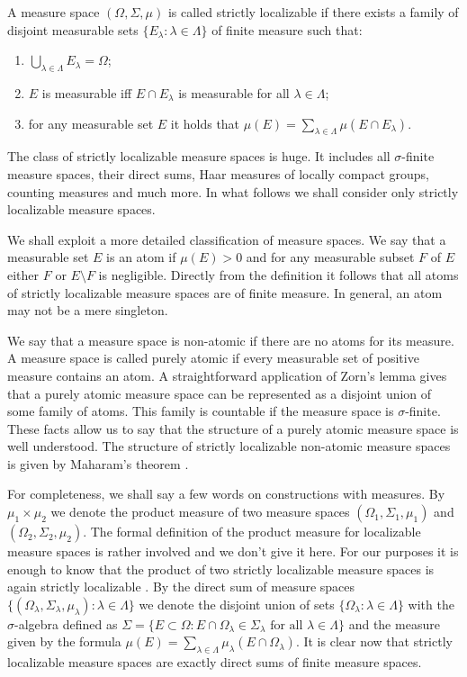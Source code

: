 A measure space $(\Omega,\Sigma,\mu)$ is called strictly localizable if there
exists a family of disjoint measurable sets 
$ \{E_\lambda:\lambda\in\Lambda \}$ of finite measure such that: 
\begin{enumerate}[label = (\roman*)]
  \item $\bigcup_{\lambda\in\Lambda}E_\lambda=\Omega$;

  \item $E$ is measurable iff $E\cap E_\lambda$ is measurable for all
  $\lambda\in\Lambda$;

  \item for any measurable set $E$ it holds that 
  $\mu(E)=\sum_{\lambda\in\Lambda}\mu(E\cap E_\lambda)$. 
\end{enumerate}
  
The class of strictly localizable measure spaces is huge. It includes all
$\sigma$-finite measure spaces, their direct sums, Haar measures of
locally compact groups, counting measures and much more. In what follows we
shall consider only strictly localizable measure spaces.

We shall exploit a more detailed classification of measure spaces. We say that a
measurable set $E$ is an atom if $\mu(E)>0$ and for any measurable subset $F$ of
$E$ either $F$ or $E\setminus F$ is negligible. Directly from the definition it
follows that all atoms of strictly localizable measure spaces are of finite
measure. In general, an atom may not be a mere singleton.

We say that a measure space is non-atomic if there are no atoms for its measure.
A measure space is called purely atomic if every measurable set of positive
measure contains an atom. A straightforward application of Zorn's lemma gives
that a purely atomic measure space can be represented as a disjoint union of some
family of atoms. This family is countable if the measure space is $\sigma$-finite.
These facts allow us to say that the structure of a purely atomic measure space is
well understood. The structure of strictly localizable non-atomic measure spaces
is given by Maharam's theorem \cite[332B]{FremMeasTh}. 

For completeness, we shall say a few words on constructions with measures. 
By $\mu_1\times \mu_2$ we denote the product measure of two measure spaces 
$(\Omega_1,\Sigma_1,\mu_1)$ and $(\Omega_2,\Sigma_2,\mu_2)$. The formal definition of
the product measure for localizable measure spaces is rather involved
\cite[definition 251F]{FremMeasTh} and we don't give it here.  For our
purposes it is enough to know that the product of two strictly localizable
measure spaces is again strictly localizable \cite[proposition 251N]{FremMeasTh}. By the direct sum of measure spaces $ \{(\Omega_\lambda, \Sigma_\lambda,
\mu_\lambda):\lambda\in\Lambda \}$ we denote the disjoint union of sets 
$\{\Omega_\lambda:\lambda\in\Lambda \}$ with the $\sigma$-algebra defined as 
$\Sigma= \{
  E\subset \Omega: E\cap \Omega_\lambda\in\Sigma_\lambda
  \text{ for all }\lambda\in\Lambda
 \}$ 
and the measure given by the formula 
$\mu(E)=\sum_{\lambda\in\Lambda}\mu_\lambda(E\cap \Omega_\lambda)$. It is clear now
that strictly localizable measure spaces are exactly direct sums of finite
measure spaces.


